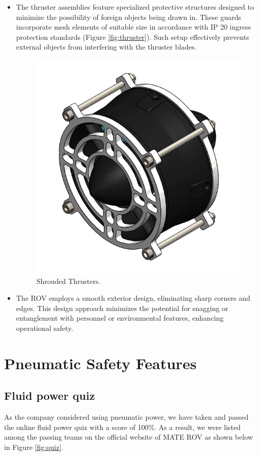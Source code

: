 \documentclass[11pt, twocolumn]{article}
\begin{document}
\begin{itemize}[leftmargin=0pt, itemindent=10pt]
    \setlength{\itemsep}{0pt}
    \item The thruster assemblies feature specialized protective structures designed to minimize the possibility of foreign objects being drawn in. These guards incorporate mesh elements of suitable size in accordance with IP 20 ingress protection standards (Figure \ref{fig:thruster}). Such setup effectively prevents external objects from interfering with the thruster blades.
    
    \begin{figure}[h]
        \centering
        \includegraphics[width=0.6\columnwidth]{Images/Thrusters.jpeg}
        \caption{Shrouded Thrusters.}
        \label{fig:shrouds}
    \end{figure}

    \item The ROV employs a smooth exterior design, eliminating sharp corners and edges. This design approach minimizes the potential for snagging or entanglement with personnel or environmental features, enhancing operational safety.
\end{itemize}

\section{Pneumatic Safety Features}

\subsection{Fluid power quiz}

As the company considered using pneumatic power, we have taken and passed the online fluid power quiz with a score of 100\%. As a result, we were listed among the passing teams on the official website of MATE ROV as shown below in Figure \ref{fig:quiz}.
\end{document}
